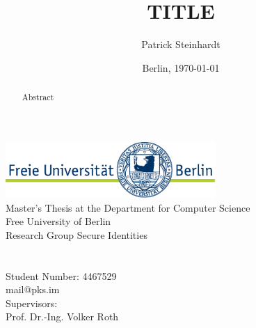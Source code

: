 \documentclass[12pt,a4paper,english]{article}
\title{TITLE}
\author{Patrick Steinhardt}
\date{Berlin, \today}
\begin{document}
    \begin{titlepage}
        \makeatletter
        \begin{center}
            \includegraphics[width=0.6\textwidth]{../resources/fu-logo.pdf}\\
            {\normalsize Master's Thesis at the Department for Computer Science\\Free University of Berlin\\Research Group Secure Identities}\\[8ex]
            {\Large \@title}\\[6ex]
            {\large \@author}\\
            {\normalsize Student Number: 4467529}\\
            {\normalsize mail@pks.im}\\[4ex]
            {\normalsize Supervisors:\\Prof. Dr.-Ing. Volker Roth}\\[4ex]
            {\normalsize \@date}
        \end{center}
        \makeatother

        \vfill{}
        \begin{abstract}

            Abstract

        \end{abstract}
        \vfill{}
    \end{titlepage}

    
    \clearpage

    \tableofcontents
    \clearpage
    \listoffigures
    \clearpage
    \lstlistoflistings
    \clearpage

    \pagestyle{fancy}
    \setcounter{page}{1}

    

    \clearpage
    \nocite{*}
    
\end{document}
